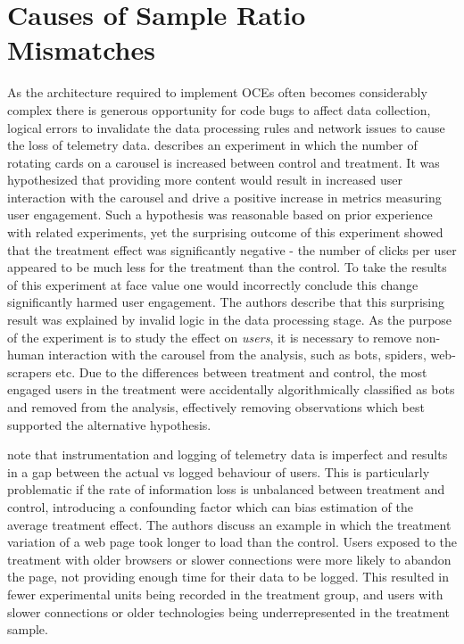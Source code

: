\documentclass[11pt]{article}
\begin{document}
\section{Causes of Sample Ratio Mismatches}
\label{sec:causes_of_srms}
As the architecture required to implement OCEs often becomes considerably complex there is generous opportunity for code bugs to affect data collection, logical errors to invalidate the data processing rules and network issues to cause the loss of telemetry data.
\cite{fabijan} describes an experiment in which the number of rotating cards on a carousel is increased between control and treatment.
It was hypothesized that providing more content would result in increased user interaction with the carousel and drive a positive increase in metrics measuring user engagement. Such a hypothesis was reasonable based on prior experience with related experiments, yet the surprising outcome of this experiment showed that the treatment effect was significantly negative - the number of clicks per user appeared to be much less for the treatment than the control. To take the results of this experiment at face value one would incorrectly conclude this change significantly harmed user engagement. The authors describe that this surprising result was explained by invalid logic in the data processing stage. As the purpose of the experiment is to study the effect on \textit{users}, it is necessary to remove non-human interaction with the carousel from the analysis, such as bots, spiders, web-scrapers etc. Due to the differences between treatment and control, the most engaged users in the treatment were accidentally algorithmically classified as bots and removed from the analysis, effectively removing observations which best supported the alternative hypothesis.

\cite{zhao} note that instrumentation and logging of telemetry data is imperfect and results in a gap between the actual vs logged behaviour of users. This is particularly problematic if the rate of information loss is unbalanced between treatment and control, introducing a confounding factor which can bias estimation of the average treatment effect. The authors discuss an example in which the treatment variation of a web page took longer to load than the control. Users exposed to the treatment with older browsers or slower connections were more likely to abandon the page, not providing enough time for their data to be logged. This resulted in fewer experimental units being recorded in the treatment group, and users with slower connections or older technologies being underrepresented in the treatment sample.  
\end{document}
